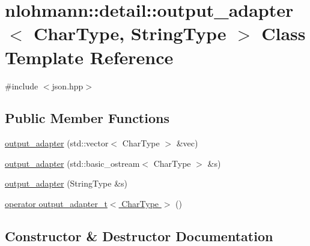 \hypertarget{classnlohmann_1_1detail_1_1output__adapter}{}\section{nlohmann\+:\+:detail\+:\+:output\+\_\+adapter$<$ Char\+Type, String\+Type $>$ Class Template Reference}
\label{classnlohmann_1_1detail_1_1output__adapter}


{\ttfamily \#include $<$json.\+hpp$>$}

\subsection*{Public Member Functions}
\begin{DoxyCompactItemize}
\item 
\hyperlink{classnlohmann_1_1detail_1_1output__adapter_a05a30a77b568fd84676078d938cbd484}{output\+\_\+adapter} (std\+::vector$<$ Char\+Type $>$ \&vec)
\item 
\hyperlink{classnlohmann_1_1detail_1_1output__adapter_a43b3ba852e6a2c3f4d312543bb04c00d}{output\+\_\+adapter} (std\+::basic\+\_\+ostream$<$ Char\+Type $>$ \&s)
\item 
\hyperlink{classnlohmann_1_1detail_1_1output__adapter_a6ad59d1ec534383b430cd7ef8a518539}{output\+\_\+adapter} (String\+Type \&s)
\item 
\hyperlink{classnlohmann_1_1detail_1_1output__adapter_a5fdac7aec8ade2f4bb0b5df30550d90c}{operator output\+\_\+adapter\+\_\+t$<$ Char\+Type $>$} ()
\end{DoxyCompactItemize}


\subsection{Constructor \& Destructor Documentation}
